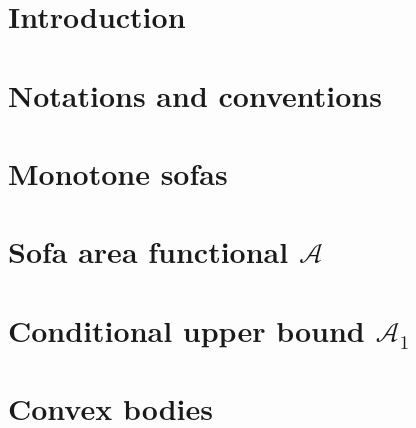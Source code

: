 \chapter{Introduction}
\label{sec:introduction}


\chapter{Notations and conventions}
\label{sec:notations-and-conventions}


\chapter{Monotone sofas}
\label{sec:monotone-sofas}


\chapter{Sofa area functional $\mathcal{A}$}
\label{sec:sofa-area-functional-a}


\chapter{Conditional upper bound $\mathcal{A}_1$}
\label{sec:conditional-upper-bound-a1}


\appendix
\chapter{Convex bodies}
\label{sec:convex-bodies}


